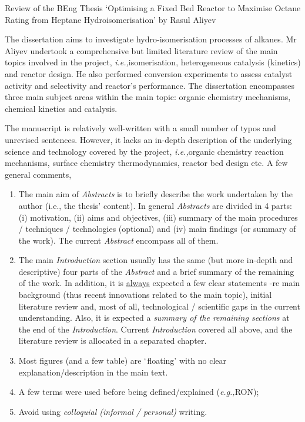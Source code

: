 \documentclass[14pt,twoside]{report}
\newcommand{\ie}{{\it i.e.,}}
\newcommand{\eg}{{\it e.g.,}}
\begin{document}

\clearpage


\bigskip

\begin{center}
  {\Large Review of the BEng Thesis `Optimising a Fixed Bed Reactor to Maximise Octane Rating from Heptane Hydroisomerisation' by Rasul Aliyev}
\end{center}
The dissertation aims to investigate hydro-isomerisation processes of alkanes. Mr Aliyev undertook a comprehensive but limited literature review of the main topics involved in the project, \ie isomerisation, heterogeneous catalysis (kinetics) and reactor design. He also performed conversion experiments to assess catalyst activity and selectivity and reactor's performance. The dissertation encompasses three main subject areas within the main topic: organic chemistry mechanisms, chemical kinetics and catalysis.

The manuscript is relatively well-written with a small number of typos and unrevised sentences. However, it lacks an in-depth description of the underlying science and technology covered by the project, \ie organic chemistry reaction mechanisms, surface chemistry thermodynamics, reactor bed design etc. A few general comments,
\begin{enumerate}
%
\item The main aim of {\it Abstracts} is to briefly describe the work undertaken by the author (i.e., the thesis' content). In general {\it Abstracts} are divided in 4 parts: (i) motivation, (ii) aims and objectives, (iii) summary of the main procedures / techniques / technologies (optional) and (iv) main findings (or summary of the work). The current {\it Abstract} encompass all of them.
%
\item The main {\it Introduction} section usually has the same (but more in-depth and descriptive) four parts of the {\it Abstract} and a brief summary of the remaining of the work. In addition, it is \underline{always} expected a few clear statements -re main background (thus recent innovations related to the main topic), initial literature review and, most of all, technological / scientific gaps in the current understanding. Also, it is expected a {\it summary of the remaining sections} at the end of the {\it Introduction}.  Current {\it Introduction} covered all above, and the literature review is allocated in a separated chapter.
%
\item Most figures (and a few table) are $\lq$floating' with no clear explanation/description in the main text.   
%
\item A few terms were used before being defined/explained (\eg RON); 
%
\item Avoid using {\it colloquial (informal / personal)} writing.
% 
\end{enumerate}
\end{document}
